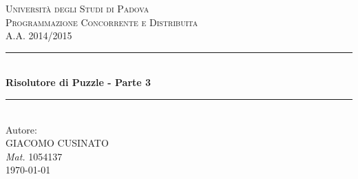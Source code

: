 \documentclass[12pt]{article} %
\begin{document}

	\begin{titlepage}

		\newcommand{\HRule}{\rule{\linewidth}{0.5mm}} %

		\center %

		\textsc{\LARGE Università degli Studi di Padova}\\[1.5cm] %
		\textsc{\Large Programmazione Concorrente e Distribuita}\\[0.5cm] %
		\textsc{\large A.A. 2014/2015}\\[0.5cm] %

		\HRule \\[0.8cm]
		{ \huge \bfseries Risolutore di Puzzle - Parte 3}\\[0.4cm] %
		\HRule \\[1.5cm]


		Autore: \\[\baselineskip]
		{\Large GIACOMO CUSINATO }\\
		{\large \emph{Mat.} 1054137 }\\[4cm] %

		{\large \today}\\[3cm] %

		\vfill %

	\end{titlepage}


	\tableofcontents %

	\newpage %


	
	
	
\end{document}
